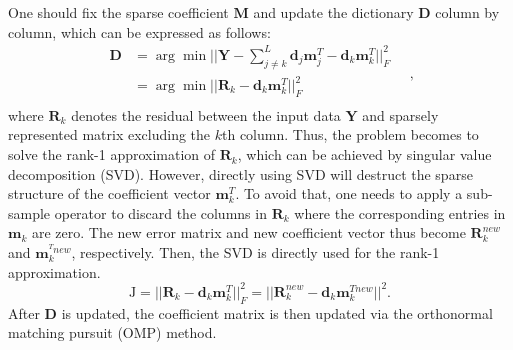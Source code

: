 One should fix the sparse coefficient $\mathbf{M}$ and update the dictionary $\mathbf{D}$ column by column, which can be expressed as follows:
\begin{equation}
\begin{split}
	\mathbf{D}		&=\arg\min||\mathbf{Y}-\sum_{j\neq k}^{L}\mathbf{d}_{j}\mathbf{m}^{T}_{j}-\mathbf{d}_{k}\mathbf{m}^{T}_{k}||^{2}_{F}\\
	&=\arg\min||\mathbf{R}_{k}-\mathbf{d}_{k}\mathbf{m}^{T}_{k}||^{2}_F\\
\end{split}
\quad ,
\end{equation}
where $\mathbf{R}_{k}$ denotes the residual between the input data $\mathbf{Y}$ and sparsely represented matrix excluding the $k$th column. Thus, the problem becomes to solve the rank-1 approximation of $\mathbf{R}_{k}$, which can be achieved by singular value decomposition (SVD). However, directly using SVD will destruct the sparse structure of the coefficient vector $\mathbf{m}^T_{k}$. To avoid that, one needs to apply a sub-sample operator to discard the columns in $\mathbf{R}_{k}$ where the corresponding entries in $\mathbf{m}_{k}$ are zero. The new error matrix and new coefficient vector thus become $\mathbf{R}^{new}_{k}$ and  $\mathbf{m}_{k}^{^Tnew}$, respectively. Then, the SVD is directly used for the rank-1 approximation. 
\begin{equation}
\text{J}=||\mathbf{R}_{k}-\mathbf{d}_{k}\mathbf{m}^T_k||_F^{2}=||\mathbf{R}_{k}^{new}-\mathbf{d}_{k}\mathbf{m}^{Tnew}_k||^{2}.
\end{equation}
After $\mathbf{D}$ is updated, the coefficient matrix is then updated via the orthonormal matching pursuit (OMP) method. 

